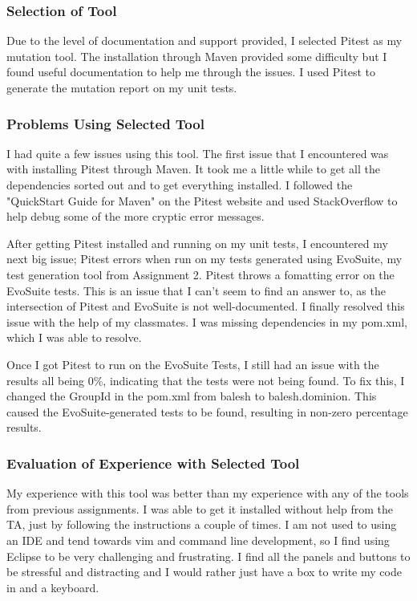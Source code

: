 \documentclass[letterpaper,10pt]{article}
\begin{document}
		\subsubsection{Selection of Tool}
		Due to the level of documentation and support provided, I selected Pitest as my 
		mutation tool. The installation through Maven provided some difficulty but I found 
		useful documentation to help me through the issues. I used Pitest to generate the 
		mutation report on my unit tests.
		\subsubsection{Problems Using Selected Tool}
		I had quite a few issues using this tool. The first issue that I encountered was with 
		installing Pitest through Maven. It took me a little while to get all the dependencies
		 sorted out and to get everything installed. I followed the "QuickStart Guide for 
		 Maven" on the Pitest website and used StackOverflow to help debug some of the more 
		 cryptic error messages.

		 After getting Pitest installed and running on my unit tests, I encountered my next 
		 big issue; Pitest errors when run on my tests generated using EvoSuite, my test 
		 generation tool from Assignment 2. Pitest throws a fomatting error on the EvoSuite 
		 tests. This is an issue that I can't seem to find an answer to, as the intersection 
		 of Pitest and EvoSuite is not well-documented. I finally resolved this issue with 
		 the help of my classmates. I was missing dependencies in my pom.xml, which I was 
		 able to resolve.

		 Once I got Pitest to run on the EvoSuite Tests, I still had an issue with the results
		  all being 0\%, indicating that the tests were not being found. To fix this, I 
		 changed the GroupId in the pom.xml from balesh to balesh.dominion. This caused the 
		 EvoSuite-generated tests to be found, resulting in non-zero percentage results.
		\subsubsection{Evaluation of Experience with Selected Tool}
		My experience with this tool was better than my experience with any of the tools from 
		previous assignments. I was able to get it installed without help from the TA, just by
		 following the instructions a couple of times. I am not used to using an IDE and tend 
		towards vim and command line development, so I find using Eclipse to be very 
		challenging and frustrating. I find all the panels and buttons to be stressful and 
		distracting and I would rather just have a box to write my code in and a keyboard.
\end{document}
